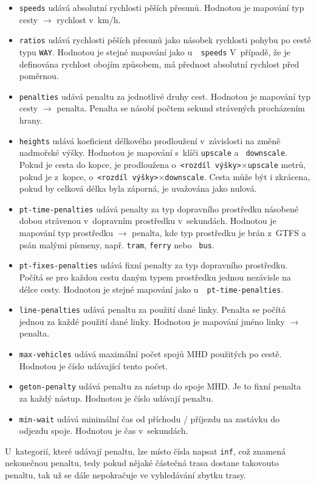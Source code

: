 \begin{itemize}
	\item {\tt speeds} udává absolutní rychlosti pěších přesunů. Hodnotou je mapování
	typ cesty $\rightarrow$ rychlost v~km/h.
	\item {\tt ratios} udává rychlosti pěších přesunů jako násobek rychlosti
	pohybu po cestě typu {\tt WAY}. Hodnotou je stejné mapování jako u~{\tt
	speeds} V~případě, že je definována rychlost obojím způsobem, má
	přednost absolutní rychlost před poměrnou.
	\item {\tt penalties} udává penaltu za jednotlivé druhy cest. Hodnotou
	je mapování typ cesty $\rightarrow$ penalta. Penalta se násobí počtem
	sekund strávených procházením hrany. 
	\item {\tt heights} udává koeficient délkového prodloužení v~závislosti
	na změně nadmořské výšky. Hodnotou je mapování s~klíči {\tt upscale} a {\tt
	downscale}.  Pokud je cesta do kopce, je prodloužena o~{\tt <rozdíl
	výšky>}$\times${\tt upscale} metrů, pokud je z~kopce, o~{\tt <rozdíl
	výšky>}$\times${\tt downscale}. Cesta může být i zkrácena, pokud by
	celková délka byla záporná, je uvažována jako nulová.
	\item {\tt pt-time-penalties} udává penalty za typ dopravního prostředku
	násobené dobou strávenou v~dopravním prostředku v~sekundách. Hodnotou je
	mapování typ prostředku $\rightarrow$ penalta, kde typ prostředku je brán
	z~GTFS a psán malými písmeny, např. {\tt tram}, {\tt ferry} nebo {\tt
	bus}.
	\item {\tt pt-fixes-penalties} udává fixní penalty za typ dopravního
	prostředku. Počítá se pro každou cestu daným typem prostředku jednou
	nezávisle na délce cesty. Hodnotou je stejné mapování jako u~{\tt
	pt-time-penalties}.
	\item {\tt line-penalties} udává penaltu za použití dané linky. Penalta
	se počítá jednou za každé použití dané linky. Hodnotou je mapování jméno
	linky $\rightarrow$ penalta. 
	\item {\tt max-vehicles} udává maximální počet spojů MHD použitých po
	cestě. Hodnotou je číslo udávající tento počet.
	\item {\tt geton-penalty} udává penaltu za nástup do spoje MHD. Je to
	fixní penalta za každý nástup. Hodnotou je číslo udávají penaltu.
	\item {\tt min-wait} udává minimální čas od příchodu /
	příjezdu na zastávku do odjezdu spoje. Hodnotou je čas v~sekundách.
\end{itemize}
U~kategorií, které udávají penaltu, lze místo čísla napsat {\tt inf}, což znamená
nekonečnou penaltu, tedy pokud nějaké částečná trasa dostane takovouto penaltu,
tak už se dále nepokračuje ve vyhledávání zbytku trasy.

